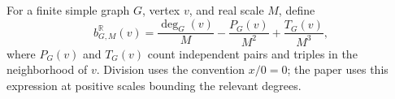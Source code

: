 \begin{definition}
For a finite simple graph $G$, vertex $v$, and real scale $M$, define
\[
b^{\mathbb R}_{G,M}(v)=\frac{\deg_G(v)}M-
\frac{P_G(v)}{M^2}+\frac{T_G(v)}{M^3},
\]
where $P_G(v)$ and $T_G(v)$ count independent pairs and triples in the
neighborhood of $v$. Division uses the convention $x/0=0$; the paper uses
this expression at positive scales bounding the relevant degrees.
\end{definition}

